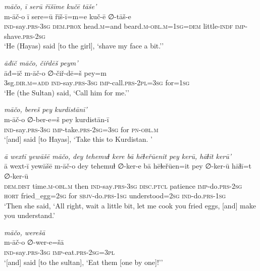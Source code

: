 \ea \label{ŽH.53}
\textit{māčo, ī serū řīšīme kučē tāše’} \\ 
\gll m-āč-o ī sere=ū řīš-ī=m=e kuč-ē ∅-tāš-e \\ 
 \textsc{ind-}say\textsc{.prs}\textsc{-3sg} \textsc{dem.prox} head\textsc{.m}=and beard\textsc{.m}\textsc{-obl}\textsc{.m}\textsc{=1sg}\textsc{=dem} little\textsc{-indf} \textsc{imp-}shave\textsc{.prs}-\textsc{2sg} \\ 
\glt `He (Hayas) said [to the girl], ‘shave my face a bit.’'
\z 
 
\ea \label{ŽH.67}
\textit{āđīč māčo, čiřdēš peym’} \\ 
\gll āđ=īč m-āč-o ∅-čiř-dē=š pey=m \\ 
 3sg\textsc{.dir}\textsc{.m}\textsc{=add} \textsc{ind-}say\textsc{.prs}\textsc{-3sg} \textsc{imp-}call\textsc{.prs}\textsc{-2pl}\textsc{=3sg} for\textsc{=1sg} \\ 
\glt `He (the Sultan) said, ‘Call him for me.’'
\z 
 
\ea \label{ŽH.69}
\textit{māčo, bereš pey kurdistānī’} \\ 
\gll m-āč-o ∅-ber-e=š pey kurdistān-ī \\ 
 \textsc{ind-}say\textsc{.prs}\textsc{-3sg} \textsc{imp-}take\textsc{.prs}-\textsc{2sg}\textsc{=3sg} for \textsc{pn}\textsc{-obl}\textsc{.m} \\ 
\glt `[and] said [to Hayas], ‘Take this to Kurdistan. '
\z 
 
\ea \label{ŽH.79}
\textit{ā wextī yewāšē māčo, dey tehemuɫ kere bā hēɫeřūenit pey kerū, hāɫīt kerū'} \\ 
\gll ā wext-ī yewāšē m-āč-o dey tehemuɫ ∅-ker-e bā hēɫeřūen=it pey ∅-ker-ū hāɫī=t ∅-ker-ū \\ 
 \textsc{dem.dist} time\textsc{.m}\textsc{-obl}\textsc{.m} then \textsc{ind-}say\textsc{.prs}\textsc{-3sg} \textsc{disc.ptcl} patience \textsc{imp-}do\textsc{.prs}-\textsc{2sg} \textsc{hort} fried\_egg\textsc{=\textsc{2sg}} for \textsc{sbjv-}do\textsc{.prs}\textsc{-1sg} understood\textsc{=\textsc{2sg}} \textsc{ind-}do\textsc{.prs}\textsc{-1sg} \\ 
\glt `Then she said, ‘All right, wait a little bit, let me cook you fried eggs, [and] make you understand.'
\z 
 
\ea \label{ŽH.94}
\textit{māčo, werešā} \\ 
\gll m-āč-o ∅-wer-e=šā \\ 
 \textsc{ind-}say\textsc{.prs}\textsc{-3sg} \textsc{imp-}eat\textsc{.prs}-\textsc{2sg}\textsc{=3pl} \\ 
\glt `[and] said [to the sultan], ‘Eat them [one by one]!’'
\z 
 
